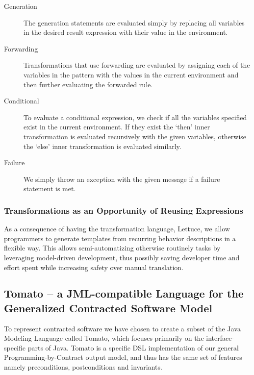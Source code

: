 \begin{description}
  \item[Generation] The generation statements are evaluated simply
    by replacing all variables in the desired result expression with their 
    value in the environment. 
  \item[Forwarding] Transformations that use forwarding are evaluated by
    assigning each of the variables in the pattern with the values in the
    current environment and then further evaluating the forwarded rule.
  \item[Conditional] To evaluate a conditional expression, we check if all
    the variables specified exist in the current environment.
    If they exist the `then' inner transformation is evaluated recursively
    with the given variables, otherwise the `else' inner transformation
    is evaluated similarly.
  \item[Failure] We simply throw an exception with the given message
    if a failure statement is met.
\end{description}

\subsubsection{Transformations as an Opportunity of Reusing Expressions}
\label{ssub:TransformationsasanOppurtunityofReusingExpressions}
As a consequence of having the transformation language, Lettuce,
we allow programmers to generate templates from recurring behavior descriptions in a flexible way. This allows semi-automatizing otherwise 
routinely tasks by leveraging model-driven development, thus possibly saving developer time and effort spent while increasing safety over manual
translation.


\subsection{Tomato -- a JML-compatible Language for the Generalized Contracted Software Model}
\label{sub:Tomato-aJML-compatibleLanguagefortheGeneralizedContractedSoftwareModel}


To represent contracted software we have chosen to create a subset of the
Java Modeling Language called Tomato,
which focuses primarily on the interface-specific parts of Java.
Tomato is a specific DSL implementation of our general Programming-by-Contract output model, and thus has the same set of features
namely preconditions, postconditions and invariants.


